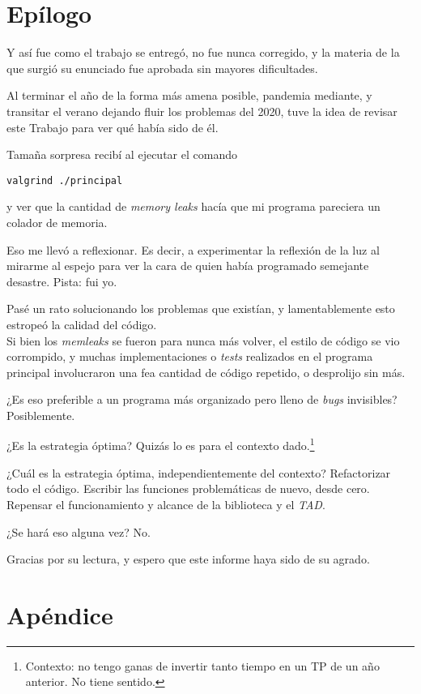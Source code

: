 \documentclass[a4paper, 12pt]{article}
\begin{document}
\newpage

\section{Epílogo}

Y así fue como el trabajo se entregó, no fue nunca corregido, y la materia de la que surgió su enunciado fue aprobada sin mayores dificultades.

Al terminar el año de la forma más amena posible, pandemia mediante, y transitar el verano dejando fluir los problemas del 2020, tuve la idea de revisar este Trabajo para ver qué había sido de él.

Tamaña sorpresa recibí al ejecutar el comando

\begin{center}
    \texttt{valgrind ./principal}
\end{center}

y ver que la cantidad de \textit{memory leaks} hacía que mi programa pareciera un colador de memoria.

Eso me llevó a reflexionar. Es decir, a experimentar la reflexión de la luz al mirarme al espejo para ver la cara de quien había programado semejante desastre. Pista: fui yo.

Pasé un rato solucionando los problemas que existían, y lamentablemente esto estropeó la calidad del código.\\
Si bien los \textit{memleaks} se fueron para nunca más volver, el estilo de código se vio corrompido, y muchas implementaciones o \textit{tests} realizados en el programa principal involucraron una fea cantidad de código repetido, o desprolijo sin más.

¿Es eso preferible a un programa más organizado pero lleno de \textit{bugs} invisibles? Posiblemente.

¿Es la estrategia óptima? Quizás lo es para el contexto dado.\footnote{Contexto: no tengo ganas de invertir tanto tiempo en un TP de un año anterior. No tiene sentido.}

¿Cuál es la estrategia óptima, independientemente del contexto? Refactorizar todo el código. Escribir las funciones problemáticas de nuevo, desde cero. Repensar el funcionamiento y alcance de la biblioteca y el \textit{TAD}.

¿Se hará eso alguna vez? No.

Gracias por su lectura, y espero que este informe haya sido de su agrado.

\section{Apéndice} \label{apendice}
\end{document}
